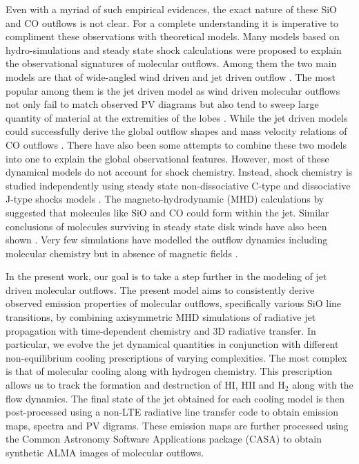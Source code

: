 \documentclass[useAMS,usenatbib,letters]{mn2e}
\begin{document}
Even with a myriad of such empirical evidences, the exact nature of
these SiO and CO outflows is not clear. For a complete understanding it is imperative
to compliment these observations with theoretical models. Many models
based on hydro-simulations and steady state shock calculations
were proposed to explain the observational signatures of molecular
outflows. Among them the two main models are that of wide-angled wind
driven \cite{Shu:1991p14071} and jet driven outflow
\cite{Canto:1991p14123}. 
The most popular among them is the jet driven model as wind
driven molecular outflows not only fail to match observed PV diagrams \cite{Cabrit:1992p14098}
but also tend to sweep large quantity of material at the extremities
of the lobes \cite{Masson:1992p14101}. While the jet driven models could successfully
derive the global outflow shapes and mass velocity relations of CO
outflows \citep{Raga:1993p9948, Masson:1993p9661} . There have also been some attempts to combine these two
models into one \cite{Shang:2006p14268} to explain the global observational features. 
However, most of these dynamical models do not
account for shock chemistry. Instead, shock chemistry is studied
independently using steady state non-dissociative C-type and
dissociative J-type shocks models \citep{Neufeld:1989p11689, Schilke:1997p14140,Flower:2003p11236}. 
The magneto-hydrodynamic (MHD) calculations by \cite{Glassgold:1991p13703} suggested that molecules
like SiO and CO could form within the jet. Similar conclusions of
molecules surviving in steady state disk winds have also been shown
\cite{Panoglou:2012p10039}. 
Very few simulations have modelled the outflow
dynamics including molecular chemistry but in absence of
magnetic fields \citep{Raga:1995p12965, Smith:2003p9985}. 


%
In the present work, our goal is to take a step further in the modeling of
jet driven molecular outflows. The present model aims to consistently derive observed emission
properties of molecular outflows, specifically various SiO line
transitions, by combining axisymmetric MHD simulations of
radiative jet propagation with time-dependent chemistry and 3D radiative
transfer. In particular, we evolve the jet dynamical
quantities in conjunction with different non-equilibrium cooling
prescriptions of varying complexities. The most complex is that of
molecular cooling along with hydrogen chemistry. This prescription
allows us to track the formation and destruction of 
HI, HII and H$_{2}$ along with the flow dynamics. 
The final state of the jet obtained for each cooling model is then
post-processed using a non-LTE radiative line transfer code
to obtain emission maps, spectra and PV digrams. These emission maps
are further processed using the Common Astronomy Software Applications
package (CASA) to obtain synthetic ALMA images of molecular outflows.
%
\end{document}
